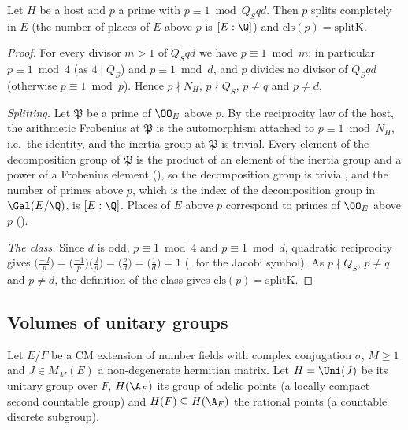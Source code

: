 \begin{proposition}\label{pf:sh-div:split}
Let $H$ be a host and $p$ a prime with $p\equiv1\bmod Q_Sqd$. Then $p$ splits completely in $E$ (the number of places of $E$
above $p$ is $[E:\Q]$) and $\mathrm{cls}(p)=\mathrm{splitK}$.
\end{proposition}

\begin{proof}
For every divisor $m>1$ of $Q_Sqd$ we have $p\equiv1\bmod m$; in particular $p\equiv1\bmod4$ (as $4\mid Q_S$) and $p\equiv1\bmod d$, and
$p$ divides no divisor of $Q_Sqd$ (otherwise $p\equiv1\bmod p$). Hence $p\nmid N_H$, $p\nmid Q_S$, $p\ne q$ and $p\ne d$.

\emph{Splitting.} Let $\mathfrak P$ be a prime of $\OO_E$ above $p$. By the reciprocity law of the host, the arithmetic Frobenius at
$\mathfrak P$ is the automorphism attached to $p\equiv1\bmod N_H$, i.e.\ the identity, and the inertia group at $\mathfrak P$ is trivial.
Every element of the decomposition group of $\mathfrak P$ is the product of an element of the inertia group and a power of a Frobenius
element (), so the decomposition group is trivial, and the number
of primes above $p$, which is the index of the decomposition group in $\Gal(E/\Q)$, is $[E:\Q]$. Places of $E$ above $p$ correspond to primes of $\OO_E$ above $p$
().

\emph{The class.} Since $d$ is odd, $p\equiv1\bmod4$ and $p\equiv1\bmod d$, quadratic reciprocity gives
$\bigl(\frac{-d}{p}\bigr)=\bigl(\frac{-1}{p}\bigr)\bigl(\frac dp\bigr)=\bigl(\frac pd\bigr)=\bigl(\frac1d\bigr)=1$
(, for the Jacobi symbol). As $p\nmid Q_S$, $p\ne q$ and $p\ne d$, the
definition of the class gives $\mathrm{cls}(p)=\mathrm{splitK}$.
\end{proof}

\subsection{Volumes of unitary groups}\label{sec:pf:sh-div:vol}

Let $E/F$ be a CM extension of number fields with complex conjugation $\sigma$, $M\ge1$ and $J\in M_M(E)$ a non-degenerate hermitian
matrix. Let $H=\Uni(J)$ be its unitary group over $F$, $H(\A_F)$ its group of adelic points (a locally compact second countable
group) and $H(F)\subseteq H(\A_F)$ the rational points (a countable discrete subgroup).

